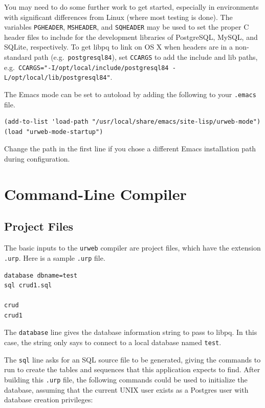 \documentclass{article}
\begin{document}
You may need to do some further work to get started, especially in environments with significant differences from Linux (where most testing is done).  The variables \texttt{PGHEADER}, \texttt{MSHEADER}, and \texttt{SQHEADER} may be used to set the proper C header files to include for the development libraries of PostgreSQL, MySQL, and SQLite, respectively.  To get libpq to link on OS X when headers are in a non-standard path (e.g.\ \texttt{postgresql84}), set \texttt{CCARGS} to add the include and lib paths, e.g.\ \texttt{CCARGS="-I/opt/local/include/postgresql84 -L/opt/local/lib/postgresql84"}.

The Emacs mode can be set to autoload by adding the following to your \texttt{.emacs} file.

\begin{verbatim}
(add-to-list 'load-path "/usr/local/share/emacs/site-lisp/urweb-mode")
(load "urweb-mode-startup")
\end{verbatim}

Change the path in the first line if you chose a different Emacs installation path during configuration.


\section{Command-Line Compiler}

\subsection{\label{cl}Project Files}

The basic inputs to the \texttt{urweb} compiler are project files, which have the extension \texttt{.urp}.  Here is a sample \texttt{.urp} file.

\begin{verbatim}
database dbname=test
sql crud1.sql

crud
crud1
\end{verbatim}

The \texttt{database} line gives the database information string to pass to libpq.  In this case, the string only says to connect to a local database named \texttt{test}.

The \texttt{sql} line asks for an SQL source file to be generated, giving the commands to run to create the tables and sequences that this application expects to find.  After building this \texttt{.urp} file, the following commands could be used to initialize the database, assuming that the current UNIX user exists as a Postgres user with database creation privileges:
\end{document}
